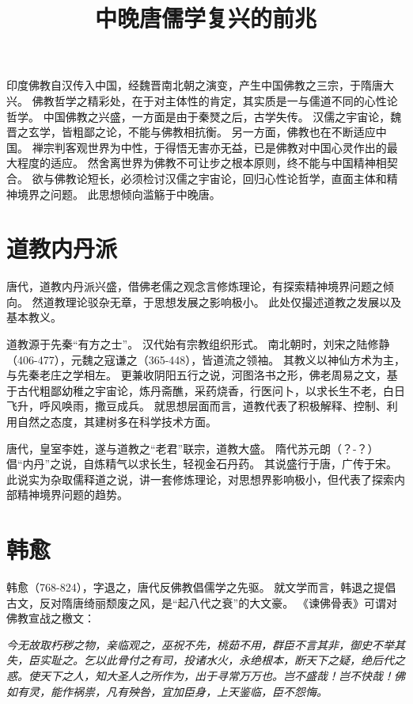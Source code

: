 \documentclass[11pt]{article}
\title{中晚唐儒学复兴的前兆}
\date{}
\begin{document}
  \maketitle

  \linenumbers
印度佛教自汉传入中国，经魏晋南北朝之演变，产生中国佛教之三宗，于隋唐大兴。
佛教哲学之精彩处，在于对主体性的肯定，其实质是一与儒道不同的心性论哲学。
中国佛教之兴盛，一方面是由于秦燹之后，古学失传。
汉儒之宇宙论，魏晋之玄学，皆粗鄙之论，不能与佛教相抗衡。
另一方面，佛教也在不断适应中国。
禅宗判客观世界为中性，于得悟无害亦无益，已是佛教对中国心灵作出的最大程度的适应。
然舍离世界为佛教不可让步之根本原则，终不能与中国精神相契合。
欲与佛教论短长，必须检讨汉儒之宇宙论，回归心性论哲学，直面主体和精神境界之问题。
此思想倾向滥觞于中晚唐。

\section{道教内丹派}
唐代，道教内丹派兴盛，借佛老儒之观念言修炼理论，有探索精神境界问题之倾向。
然道教理论驳杂无章，于思想发展之影响极小。
此处仅撮述道教之发展以及基本教义。

\newline

道教源于先秦“有方之士”。
汉代始有宗教组织形式。
南北朝时，刘宋之陆修静（406-477），元魏之寇谦之（365-448），皆道流之领袖。
其教义以神仙方术为主，与先秦老庄之学相左。
更兼收阴阳五行之说，河图洛书之形，佛老周易之文，基于古代粗鄙幼稚之宇宙论，炼丹斋醮，采药烧香，行医问卜，以求长生不老，白日飞升，呼风唤雨，撒豆成兵。
就思想层面而言，道教代表了积极解释、控制、利用自然之态度，其建树多在科学技术方面。

\newline

唐代，皇室李姓，遂与道教之“老君”联宗，道教大盛。
隋代苏元朗（？-？）倡“内丹”之说，自炼精气以求长生，轻视金石丹药。
其说盛行于唐，广传于宋。
此说实为杂取儒释道之说，讲一套修炼理论，对思想界影响极小，但代表了探索内部精神境界问题的趋势。

\section{韩愈}
韩愈（768-824），字退之，唐代反佛教倡儒学之先驱。
就文学而言，韩退之提倡古文，反对隋唐绮丽颓废之风，是“起八代之衰”的大文豪。
《谏佛骨表》可谓对佛教宣战之檄文：

\textit{今无故取朽秽之物，亲临观之，巫祝不先，桃茹不用，群臣不言其非，御史不举其失，臣实耻之。乞以此骨付之有司，投诸水火，永绝根本，断天下之疑，绝后代之惑。使天下之人，知大圣人之所作为，出于寻常万万也。岂不盛哉！岂不快哉！佛如有灵，能作祸祟，凡有殃咎，宜加臣身，上天鉴临，臣不怨悔。}
\end{document}

